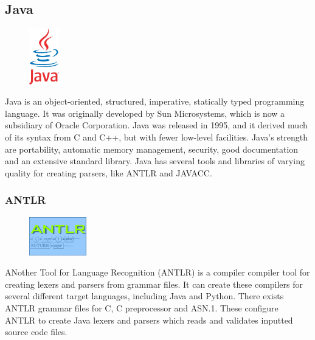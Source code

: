 \subsection{Java}
\begin{figure}
	\begin{center}
	\vspace{-30pt}
		\includegraphics[width=1.3cm]{./planning/img/java-logo}
	\vspace{-30pt}
	\end{center}
\end{figure}
Java is an object-oriented, structured, imperative, statically typed
programming language. It was originally developed by Sun Microsystems, which
is now a subsidiary of Oracle Corporation. Java was released in 1995, and it
derived much of its syntax from C and C++, but with fewer low-level facilities.
Java’s strength are portability, automatic memory management, security, good
documentation and an extensive standard library. Java has several tools and
libraries of varying quality for creating parsers, like ANTLR and JAVACC.

\subsubsection{ANTLR}
\begin{figure}
	\begin{center}
	\vspace{-30pt}
		\includegraphics[width=2.5cm]{./planning/img/antlr_logo}
	\vspace{-30pt}
	\end{center}
\end{figure}
ANother Tool for Language Recognition (ANTLR) is a compiler compiler tool for
creating lexers and parsers from grammar files. It can create these compilers
for several different target languages, including Java and Python. There exists
ANTLR grammar files for C, C preprocessor and ASN.1. These configure ANTLR to
create Java lexers and parsers which reads and validates inputted source code
files.

